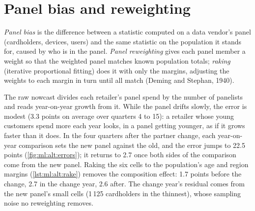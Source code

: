 \section{Panel bias and reweighting}

\begin{definition}\label{def:ml:alternative-data-pipelines:panel}
\emph{Panel bias} is the difference between a statistic computed on a data vendor's panel (cardholders,
devices, users) and the same statistic on the population it stands for, caused by who is in the panel. \emph{Panel
reweighting} gives each panel member a weight so that the weighted panel matches known population
totals; \emph{raking} (iterative proportional fitting) does it with only the margins, adjusting the weights to each margin
in turn until all match (Deming and Stephan, 1940).
\end{definition}

The raw nowcast divides each retailer's panel spend by the number of panelists and reads year-on-year growth from it. While
the panel drifts slowly, the error is modest (3.3 points on average over quarters 4 to 15): a retailer whose young customers
spend more each year looks, in a panel getting younger, as if it grows faster than it does. In the four quarters after the
partner change, each year-on-year comparison sets the new panel against the old, and the error jumps to 22.5 points
(\cref{fig:ml:alt:errors}); it returns to 2.7 once both sides of the comparison come from the new panel. Raking the six cells
to the population's age and region margins (\cref{lst:ml:alt:rake}) removes the composition effect: 1.7 points before the
change, 2.7 in the change year, 2.6 after. The change year's residual comes from the new panel's small cells (1\,125
cardholders in the thinnest), whose sampling noise no reweighting removes.

